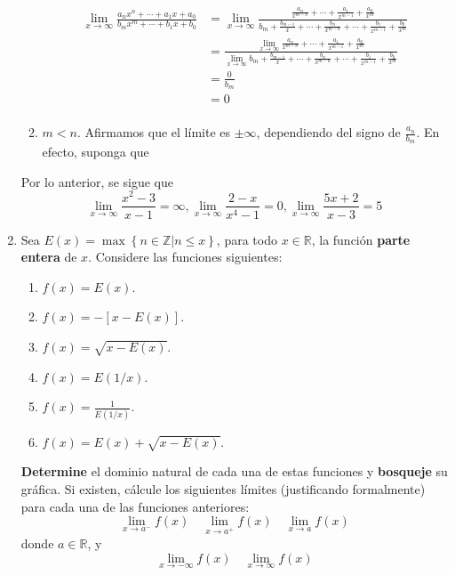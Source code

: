 \documentclass[12pt]{article}
\begin{document}
\begin{enumerate}
\begin{sol}
\begin{enumerate}
\begin{equation*}
                \begin{split}
                    \lim_{ x\rightarrow\infty}\frac{a_nx^n+\cdots+a_1x+a_0}{b_mx^m+\cdots+b_1x+b_0}&=\lim_{ x\rightarrow\infty}\frac{\frac{a_n}{x^{ m-n}} +\cdots+\frac{a_1}{x^{ m-1}} +\frac{a_0}{x^m}}{b_m+\frac{b_ {m-1}}{x} +\cdots+\frac{b_n}{x^{ m-n}} +\cdots+\frac{b_1}{x^{ m-1}}+\frac{b_0}{x^m}}\\
                    &=\frac{\lim_{ x\rightarrow\infty}\frac{a_n}{x^{ m-n}} +\cdots+\frac{a_1}{x^{ m-1}} +\frac{a_0}{x^m}}{\lim_{ x\rightarrow\infty}b_m+\frac{b_ {m-1}}{x} +\cdots+\frac{b_n}{x^{ m-n}} +\cdots+\frac{b_1}{x^{ m-1}}+\frac{b_0}{x^m}}\\
                    &=\frac{0}{b_m}\\
                    &=0\\
                \end{split}
            \end{equation*}
            \item $m<n$. Afirmamos que el límite es $\pm\infty$, dependiendo del signo de $\frac{a_n}{b_m}$. En efecto, suponga que %
        \end{enumerate}
        Por lo anterior, se sigue que
        \begin{equation*}
            \lim_{ x\rightarrow\infty}\frac{x^2-3}{x-1}=\infty,\lim_{ x\rightarrow\infty}\frac{2-x}{x^4-1}=0,\lim_{ x\rightarrow\infty}\frac{5x+2}{x-3}=5
        \end{equation*}
    \end{sol}

    \item Sea $E(x)=\max\left\{n\in\mathbb{Z}\Big|n\leq x \right\}$, para todo $x\in\mathbb{R}$, la función \textbf{parte entera} de $x$. Considere las funciones siguientes:
    \begin{enumerate}
        \item $f(x)=E(x)$.
        \item $f(x)=-[x-E(x)]$.
        \item $f(x)=\sqrt{x-E(x)}$.
        \item $f(x)=E(1/x)$.
        \item $f(x)=\frac{1}{E(1/x)}$.
        \item $f(x)=E(x)+\sqrt{x-E(x)}$.
    \end{enumerate}
    \textbf{Determine} el dominio natural de cada una de estas funciones y \textbf{bosqueje} su gráfica. Si existen, cálcule los siguientes límites (justificando formalmente) para cada una de las funciones anteriores:
    \begin{equation*}
        \lim_{ x\rightarrow a^-}f(x)\quad\lim_{ x\rightarrow a^+}f(x)\quad\lim_{ x\rightarrow a}f(x)
    \end{equation*}
    donde $a\in\mathbb{R}$, y
    \begin{equation*}
        \lim_{ x\rightarrow-\infty}f(x)\quad\lim_{ x\rightarrow\infty}f(x)
    \end{equation*}


\end{enumerate}
\end{document}
